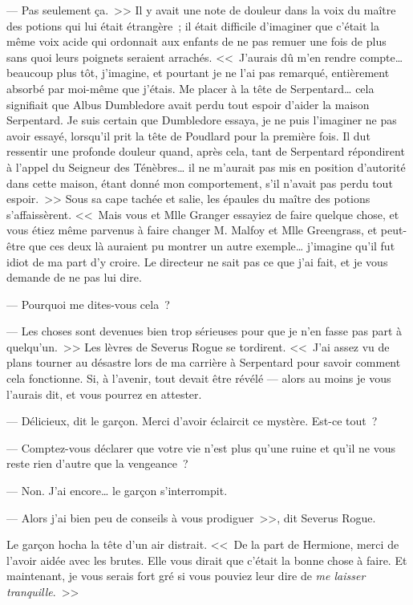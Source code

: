 --- Pas seulement ça.~>> Il y avait une note de douleur dans la voix du maître des potions qui lui était étrangère~; il était difficile d'imaginer que c'était la même voix acide qui ordonnait aux enfants de ne pas remuer une fois de plus sans quoi leurs poignets seraient arrachés. <<~J'aurais dû m'en rendre compte… beaucoup plus tôt, j'imagine, et pourtant je ne l'ai pas remarqué, entièrement absorbé par moi-même que j'étais. Me placer à la tête de Serpentard… cela signifiait que Albus Dumbledore avait perdu tout espoir d'aider la maison Serpentard. Je suis certain que Dumbledore essaya, je ne puis l'imaginer ne pas avoir essayé, lorsqu'il prit la tête de Poudlard pour la première fois. Il dut ressentir une profonde douleur quand, après cela, tant de Serpentard répondirent à l'appel du Seigneur des Ténèbres… il ne m'aurait pas mis en position d'autorité dans cette maison, étant donné mon comportement, s'il n'avait pas perdu tout espoir.~>> Sous sa cape tachée et salie, les épaules du maître des potions s'affaissèrent. <<~Mais vous et Mlle Granger essayiez de faire quelque chose, et vous étiez même parvenus à faire changer M. Malfoy et Mlle Greengrass, et peut-être que ces deux là auraient pu montrer un autre exemple… j'imagine qu'il fut idiot de ma part d'y croire. Le directeur ne sait pas ce que j'ai fait, et je vous demande de ne pas lui dire.

--- Pourquoi me dites-vous cela~?

--- Les choses sont devenues bien trop sérieuses pour que je n'en fasse pas part à quelqu'un.~>> Les lèvres de Severus Rogue se tordirent. <<~J'ai assez vu de plans tourner au désastre lors de ma carrière à Serpentard pour savoir comment cela fonctionne. Si, à l'avenir, tout devait être révélé — alors au moins je vous l'aurais dit, et vous pourrez en attester.

--- Délicieux, dit le garçon. Merci d'avoir éclaircit ce mystère. Est-ce tout~?

--- Comptez-vous déclarer que votre vie n'est plus qu'une ruine et qu'il ne vous reste rien d'autre que la vengeance~?

--- Non. J'ai encore… le garçon s'interrompit.

--- Alors j'ai bien peu de conseils à vous prodiguer~>>, dit Severus Rogue.

Le garçon hocha la tête d'un air distrait. <<~De la part de Hermione, merci de l'avoir aidée avec les brutes. Elle vous dirait que c'était la bonne chose à faire. Et maintenant, je vous serais fort gré si vous pouviez leur dire de \emph{me laisser tranquille}.~>>

